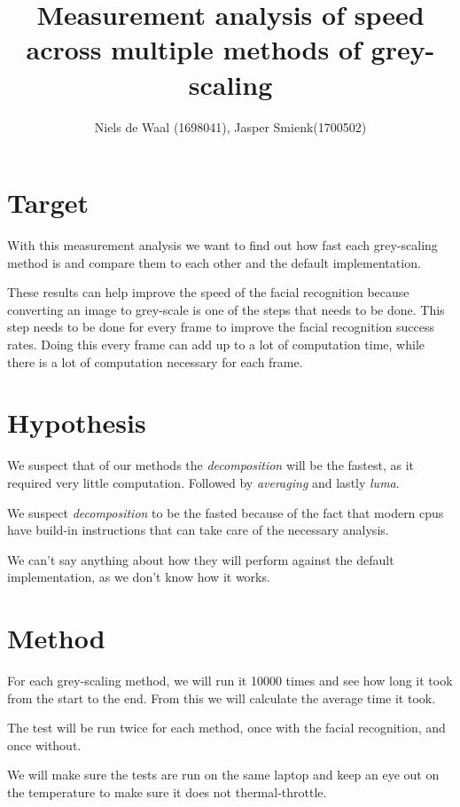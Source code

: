 \documentclass[a4paper]{article}
\begin{document}
\title{Measurement analysis of speed across multiple methods of grey-scaling}
\author{Niels de Waal (1698041), Jasper Smienk(1700502)}
\maketitle
\newpage

\tableofcontents
\newpage

\section{Target}
With this measurement analysis we want to find out how fast each grey-scaling method is and compare them to each other and the default implementation.

These results can help improve the speed of the facial recognition because converting an image to grey-scale is one of the steps that needs to be done. This step needs to be done for every frame to improve the facial recognition success rates. Doing this every frame can add up to a lot of computation time, while there is a lot of computation necessary for each frame.

\section{Hypothesis}
We suspect that of our methods the \textit{decomposition} will be the fastest, as it required very little computation. Followed by \textit{averaging} and lastly \textit{luma}.

We suspect \textit{decomposition} to be the fasted because of the fact that modern cpus have build-in instructions that can take care of the necessary analysis.

We can't say anything about how they will perform against the default implementation, as we don't know how it works.

\section{Method}
For each grey-scaling method, we will run it 10000 times and see how long it took from the start to the end. From this we will calculate the average time it took.

The test will be run twice for each method, once with the facial recognition, and once without.

We will make sure the tests are run on the same laptop and keep an eye out on the temperature to make sure it does not thermal-throttle.
\end{document}
